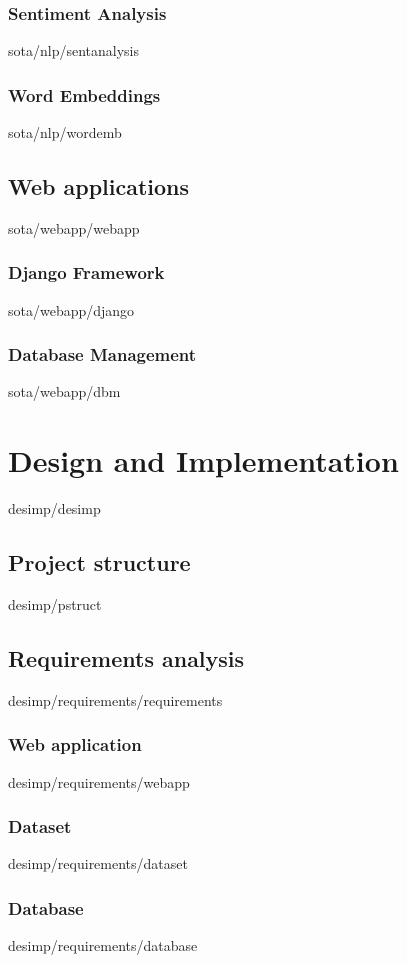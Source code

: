 \documentclass[english,epsbased,copyright,final,printable,covers,extendedindex,firstnumbered,tfg,gnuplot,loc,loe,lof,lot]{tfgtfmthesisuam}
\begin{document}
      \subsection{Sentiment Analysis\label{SS:SENTANALYSIS}}{sota/nlp/sentanalysis}
      \subsection{Word Embeddings\label{SS:WORDEMB}}{sota/nlp/wordemb}
    \section{Web applications\label{SEC:WEBAPP}}{sota/webapp/webapp}
      \subsection{Django Framework\label{SS:DJANGO}}{sota/webapp/django}
      \subsection{Database Management\label{SS:DBM}}{sota/webapp/dbm}

  \chapter{Design and Implementation\label{CAP:DESIMP}}{desimp/desimp}
    \section{Project structure\label{SEC:PSTRUCT}}{desimp/pstruct}
    \section{Requirements analysis\label{SEC:REQUIREMENTS}}{desimp/requirements/requirements}
      \subsection{Web application\label{SS:WEBAPP_REQ}}{desimp/requirements/webapp}
      \subsection{Dataset\label{SS:DATASET_REQ}}{desimp/requirements/dataset}
      \subsection{Database\label{SS:DATABASE_REQ}}{desimp/requirements/database}
\end{document}
